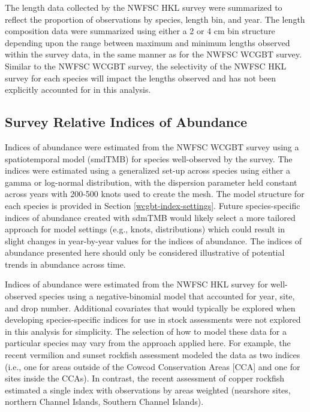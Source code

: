 \documentclass[
  english,
]{article}
\begin{document}
The length data collected by the NWFSC HKL survey were summarized to
reflect the proportion of observations by species, length bin, and year.
The length composition data were summarized using either a 2 or 4 cm bin
structure depending upon the range between maximum and minimum lengths
observed within the survey data, in the same manner as for the NWFSC
WCGBT survey. Similar to the NWFSC WCGBT survey, the selectivity of the
NWFSC HKL survey for each species will impact the lengths observed and
has not been explicitly accounted for in this analysis.

\subsection{Survey Relative Indices of
Abundance}\label{survey-relative-indices-of-abundance}

Indices of abundance were estimated from the NWFSC WCGBT survey using a
spatiotemporal model (smdTMB) for species well-observed by the survey.
The indices were estimated using a generalized set-up across species
using either a gamma or log-normal distribution, with the dispersion
parameter held constant across years with 200-500 knots used to create
the mesh. The model structure for each species is provided in Section
\ref{wcgbt-index-settings}. Future species-specific indices of abundance
created with sdmTMB would likely select a more tailored approach for
model settings (e.g., knots, distributions) which could result in slight
changes in year-by-year values for the indices of abundance. The indices
of abundance presented here should only be considered illustrative of
potential trends in abundance across time.

Indices of abundance were estimated from the NWFSC HKL survey for
well-observed species using a negative-binomial model that accounted for
year, site, and drop number. Additional covariates that would typically
be explored when developing species-specific indices for use in stock
assessments were not explored in this analysis for simplicity. The
selection of how to model these data for a particular species may vary
from the approach applied here. For example, the recent vermilion and
sunset rockfish assessment modeled the data as two indices (i.e., one
for areas outside of the Cowcod Conservation Areas {[}CCA{]} and one for
sites inside the CCAs). In contrast, the recent assessment of copper
rockfish estimated a single index with observations by areas weighted
(nearshore sites, northern Channel Islands, Southern Channel Islands).
\end{document}
